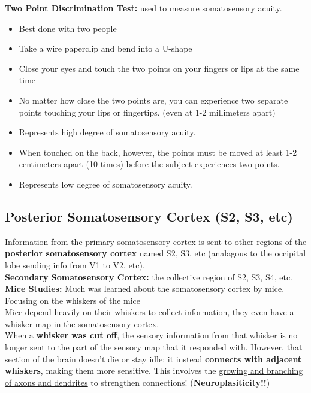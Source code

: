 \documentclass{article}
\begin{document}
\noindent \textbf{Two Point Discrimination Test:} used to measure somatosensory acuity. 
\begin{itemize}
    \item Best done with two people
    \item Take a wire paperclip and bend into a U-shape
    \item Close your eyes and touch the two points on your fingers or lips at the same time
    \item No matter how close the two points are, you can experience two separate points touching your lips or fingertips. (even at 1-2 millimeters apart)
    \item Represents high degree of somatosensory acuity.
    \item When touched on the back, however, the points must be moved at least 1-2 centimeters apart (10 times) before the subject experiences two points. 
    \item Represents low degree of somatosensory acuity. 
\end{itemize}

\subsection{Posterior Somatosensory Cortex (S2, S3, etc)}
Information from the primary somatosensory cortex is sent to other regions of the\textbf{ posterior somatosensory cortex} named S2, S3, etc (analagous to the occipital lobe sending info from V1 to V2, etc). \\

\noindent \textbf{Secondary Somatosensory Cortex:} the collective region of S2, S3, S4, etc. \\

\noindent \textbf{Mice Studies:} Much was learned about the somatosensory cortex by mice. Focusing on the whiskers of the mice\\
Mice depend heavily on their whiskers to collect information, they even have a whisker map in the somatosensory cortex. \\ 

When a \textbf{whisker was cut off}, the sensory information from that whisker is no longer sent to the part of the sensory map that it responded with. However, that section of the brain doesn't die or stay idle; it instead \textbf{connects with adjacent whiskers}, making them more sensitive. This involves the \underline{growing and branching of axons and dendrites} to strengthen connections! (\textbf{Neuroplasiticity!!}) \\
\end{document}

